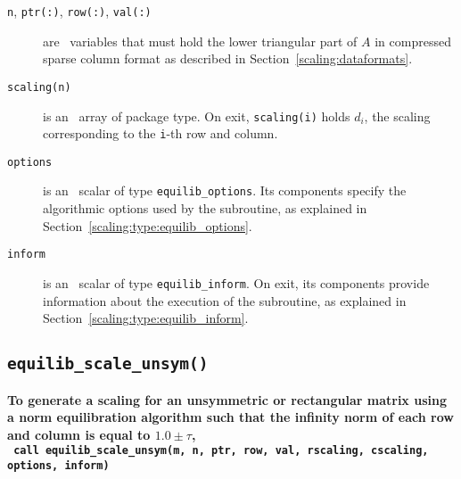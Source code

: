 \begin{description}

\item[\texttt{n}, \texttt{ptr(:)}, \texttt{row(:)}, \texttt{val(:)}] are \intentin\ variables that must hold the lower triangular part of $A$ in compressed sparse column format as described in Section~\ref{scaling:dataformats}.

\item[\texttt{scaling(n)}] is an \intentout\ array of package type. On exit,
\texttt{scaling(i)} holds $d_i$, the scaling corresponding to the
\texttt{i}-th row and column.

\item[\texttt{options}] is an \intentin\ scalar of type \texttt{equilib\_options}. Its components specify the algorithmic options used by the subroutine, as explained in Section~\ref{scaling:type:equilib_options}.

\item[\texttt{inform}] is an \intentout\ scalar of type \texttt{equilib\_inform}. On exit, its components provide information about the execution of the subroutine, as explained in Section~\ref{scaling:type:equilib_inform}.

\end{description}

\subsection{\texttt{equilib\_scale\_unsym()}}

\textbf{\noindent
   To generate a scaling for an unsymmetric or rectangular matrix using a norm equilibration algorithm such that the infinity norm of each row and column is equal to $1.0\pm\tau$,
   \vspace*{0.3cm} \\
   \texttt{ \hspace*{0.2cm}
      call equilib\_scale\_unsym(m, n, ptr, row, val, rscaling, cscaling, options, inform)
   }
   \vspace{0.3cm}
}


